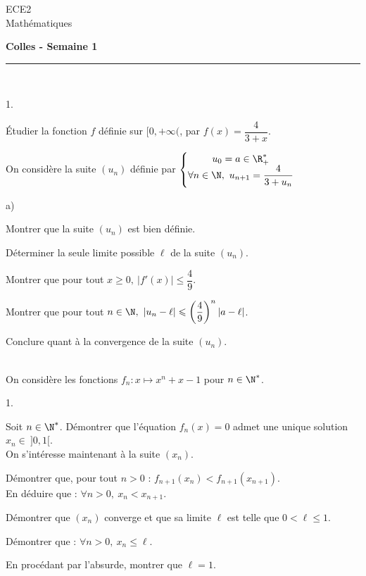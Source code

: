 \documentclass[11pt]{article}%
\begin{document}
\begin{flushleft}
ECE2 \\
Mathématiques
\end{flushleft}

\begin{center}
\textbf{\Large{Colles - Semaine 1}}
\end{center}

\hrule

\vspace*{0,2cm}
 
\begin{exercice}~
\begin{noliste}{1.}
\item \'Etudier la fonction $f$ définie sur $[0,+ \infty($, par $ 
f(x) = \dfrac{4}{3+x}$.
\item On considère la suite $(u_n)$ définie par $ \left\{ 
\begin{matrix}
u_0=a \in \R_+^*\\
\forall n \in \N, \ u_{n+1} = \dfrac{4}{3+u_n}
\end{matrix} \right.$
\begin{noliste}{a)}
\item Montrer que la suite $(u_n)$ est bien définie.
\item Déterminer la seule limite possible $\ell$ de la suite $(u_n)$.
\item Montrer que pour tout $ x \geq 0, \ \vert f'(x) \vert \leq
\dfrac{4}{9}$.
\item Montrer que pour tout $ n \in \N, \ \vert u_n - \ell \vert 
\leq \left( \dfrac{4}{9} \right)^n \vert a- \ell \vert$.
\item Conclure quant à la convergence de la suite $(u_n)$.
\end{noliste}
\end{noliste}
\end{exercice}

\begin{exercice}~\\
  On considère les fonctions $f_n : x \mapsto x^n + x - 1$ pour $n \in
  \N^*$.
  \begin{noliste}{1.}
  \item Soit $n\in\N^*$. Démontrer que l'équation $f_n(x) = 0$ admet
    une unique solution $x_n \in \ ]0,1[$.\\
    On s'intéresse maintenant à la suite $(x_n)$.
  \item Démontrer que, pour tout $n>0$ : $f_{n+1}(x_n) <
    f_{n+1}(x_{n+1})$.\\
    En déduire que : $\forall n>0, \ x_n < x_{n+1}$.
  \item Démontrer que $(x_n)$ converge et que sa limite $\ell$ est
    telle que $0 < \ell \leq 1$.
  \item Démontrer que : $\forall n>0, \ x_n \leq \ell$.
  \item En procédant par l'absurde, montrer que $\ell = 1$.
  \end{noliste}
\end{exercice}
\end{document}
